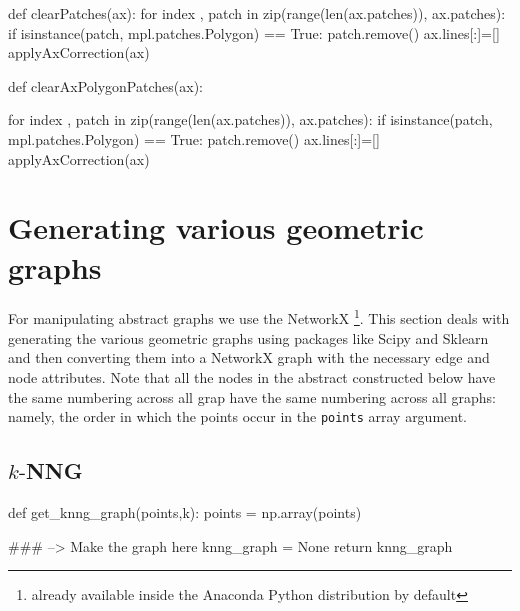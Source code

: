 def clearPatches(ax):
    for index , patch in zip(range(len(ax.patches)), ax.patches):
        if isinstance(patch, mpl.patches.Polygon) == True:
            patch.remove()
    ax.lines[:]=[]
    applyAxCorrection(ax)

def clearAxPolygonPatches(ax):

    for index , patch in zip(range(len(ax.patches)), ax.patches):
        if isinstance(patch, mpl.patches.Polygon) == True:
            patch.remove()
    ax.lines[:]=[]
    applyAxCorrection(ax)
\nwendcode{}\nwdocspar


\section{Generating various geometric graphs}

For manipulating abstract graphs we use the NetworkX \cite{hagberg2008exploring} \footnote{already available inside the Anaconda Python distribution by default}. 
This section deals with generating the various geometric graphs using packages like Scipy and Sklearn and then converting them into a NetworkX graph
with the necessary edge and node attributes. Note that all the nodes in the abstract constructed below have the same numbering across all grap have the same 
numbering across all graphs: namely, the order in which the points occur in the \verb|points| array argument. 


\subsection{$k\text{-}$NNG}
\nwenddocs{}\endmoddef\nwstartdeflinemarkup{}\nwenddeflinemarkup

def get_knng_graph(points,k):
     points = np.array(points)

     ### --> Make the graph here
     knng_graph = None
     return knng_graph
\nwendcode{}\nwdocspar




